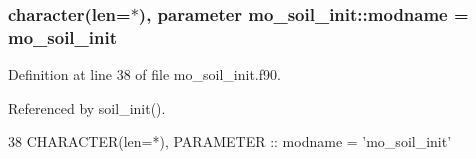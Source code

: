 \subsubsection[{modname}]{\setlength{\rightskip}{0pt plus 5cm}character(len=$\ast$), parameter mo\+\_\+soil\+\_\+init\+::modname = \textquotesingle{}mo\+\_\+soil\+\_\+init\textquotesingle{}}\label{namespacemo__soil__init_a32fc6da5806ec1cdfa46775e465bda3a}


Definition at line 38 of file mo\+\_\+soil\+\_\+init.\+f90.



Referenced by soil\+\_\+init().


\begin{DoxyCode}
38   \textcolor{keywordtype}{CHARACTER(len=*)}, \textcolor{keywordtype}{PARAMETER} :: modname = \textcolor{stringliteral}{'mo\_soil\_init'}
\end{DoxyCode}
